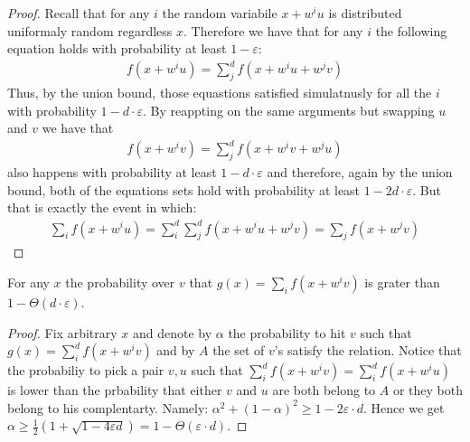 \begin{proof}
  Recall that for any $i$ the random variabile $x + w^{i}u$ is distributed uniformaly random regardless $x$. Therefore we have that for any $i$ the following equation holds with probability at least $1 -\varepsilon$:      
  \begin{equation*}
    \begin{split}
    f\left( x + w^{i}u \right) = \sum_{j}^{d}{f\left( x +w^{i}u + w^{j}v \right)} 
    \end{split}
  \end{equation*}
  Thus, by the union bound, those equastions satisfied simulatnusly for all the $i$ with probability $1 - d\cdot \varepsilon$. By reappting on the same arguments but swapping $u$ and $v$ we have that 
\begin{equation*}
    \begin{split}
    f\left( x + w^{i}v \right) = \sum_{j}^{d}{f\left( x +w^{i}v + w^{j}u \right)} 
    \end{split}
  \end{equation*}
also happens with probability at least $1- d\cdot\varepsilon$ and therefore, again by the union bound, both of the equations sets hold with probability at least $1 - 2d\cdot\varepsilon$. But that is exactly the event in which: 
\begin{equation*}
  \begin{split} 
    \sum_{i}{f\left( x + w^{i}u \right)} = \sum_{i}^{d}\sum^{d}_{j}{f\left( x +w^{i}u + w^{j}v \right)} =  \sum_{j}{f\left( x + w^{j}v \right)}
  \end{split}
\end{equation*}
\end{proof}
\begin{claim}
  \label{claim:fixx}
  For any $x$ the probability over $v$ that $g\left( x \right) = \sum_{i}{f(x + w^{i}v)}$ is grater than $ 1 - \Theta\left( d \cdot \varepsilon  \right)$. 
\end{claim}
\begin{proof}
  Fix arbitrary $x$ and denote by $\alpha$ the probability to hit $v$ such that $g(x) = \sum_{i}^{d}{f\left( x + w^{i}v \right)}$ and by $A$ the set of $v$'s satisfy the relation. Notice that the probabiliy to pick a pair $v,u$ such that $ \sum_{i}^{d}{f\left( x + w^{i}v \right)} = \sum_{i}^{d}{f\left( x + w^{i}u \right)}$ is lower than the prbability that either $v$ and $u$ are both belong to $A$ or they both belong to his complentarty. Namely: $ \alpha^{2} + (1-\alpha)^{2}\ge 1- 2 \varepsilon\cdot d$. Hence we get $\alpha \ge \frac{1}{2}\left( 1 + \sqrt{1 - 4\varepsilon d } \right) = 1 - \Theta\left( \varepsilon \cdot d \right)$.  
\end{proof}

